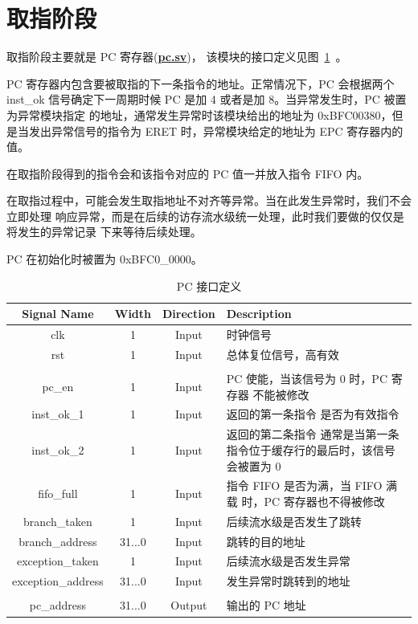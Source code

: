 \documentclass[blue,normal,cn,hide]{elegantbook}
\begin{document}
\section{取指阶段}

取指阶段主要就是 PC 寄存器(\href{https://github.com/name1e5s/Sirius/blob/master/pc.sv}{\textbf{pc.sv}})，
该模块的接口定义见图~\ref{tab:PCInterface}~。

PC 寄存器内包含要被取指的下一条指令的地址。正常情况下，PC 会根据两个 inst\_ok
信号确定下一周期时候 PC 是加 4 或者是加 8。当异常发生时，PC 被置为异常模块指定
的地址，通常发生异常时该模块给出的地址为 0xBFC00380，但是当发出异常信号的指令为
ERET 时，异常模块给定的地址为 EPC 寄存器内的值。

在取指阶段得到的指令会和该指令对应的 PC 值一并放入指令 FIFO 内。

在取指过程中，可能会发生取指地址不对齐等异常。当在此发生异常时，我们不会立即处理
响应异常，而是在后续的访存流水级统一处理，此时我们要做的仅仅是将发生的异常记录
下来等待后续处理。

PC 在初始化时被置为 0xBFC0\_0000。

\begin{table}
    \renewcommand\arraystretch{1.25}
    \centering
    \begin{tabular}{cccm{}}
        \toprule 
        \rowcolor{black!20} \textbf{Signal Name} & \textbf{Width} & \textbf{Direction} & \textbf{Description} \\
        \midrule
        clk & 1 & Input & 时钟信号 \\
        rst & 1 & Input & 总体复位信号，高有效 \\
        \\
        pc\_en & 1 & Input & PC 使能，当该信号为 0 时，PC 寄存器
        不能被修改 \\
        inst\_ok\_1 & 1 & Input & 返回的第一条指令
        是否为有效指令 \\
        inst\_ok\_2 & 1 & Input & 返回的第二条指令
        通常是当第一条指令位于缓存行的最后时，该信号会被置为 0 \\
        fifo\_full & 1 & Input & 指令 FIFO 是否为满，当 FIFO 满载
        时，PC 寄存器也不得被修改 \\
        branch\_taken & 1 & Input & 后续流水级是否发生了跳转 \\
        branch\_address & 31...0 & Input & 跳转的目的地址 \\ 
        exception\_taken & 1 & Input & 后续流水级是否发生异常 \\
        exception\_address & 31...0 & Input & 发生异常时跳转到的地址 \\
        \\
        pc\_address & 31...0 & Output & 输出的 PC 地址 \\
        \bottomrule
    \end{tabular}
    \caption{PC 接口定义}
    \label{tab:PCInterface}
\end{table}
\end{document}
